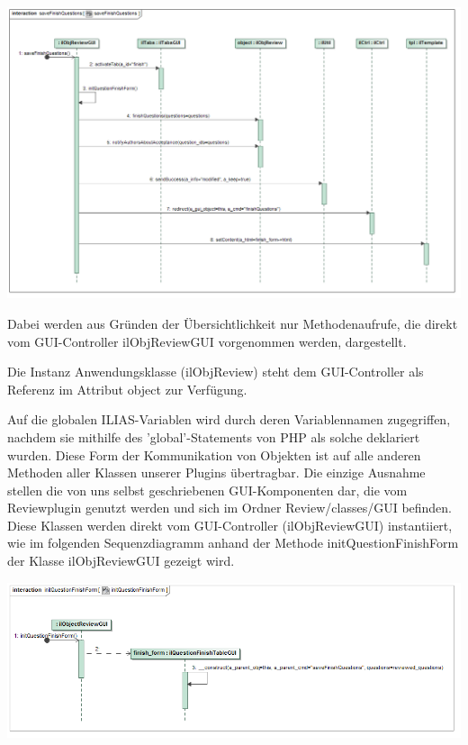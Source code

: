 \documentclass[a4paper]{scrreprt}
\begin{document}
\includegraphics[width=1.0\textwidth]{Sequence_Diagram__saveFinishQuestions__saveFinishQuestions.png}
\label{Fertige Fragen Speichern}

Dabei werden aus Gründen der Übersichtlichkeit nur Methodenaufrufe, die direkt vom GUI-Controller ilObjReviewGUI vorgenommen werden, dargestellt. 

Die Instanz Anwendungsklasse (ilObjReview) steht dem GUI-Controller als Referenz im Attribut object zur Verfügung.

Auf die globalen ILIAS-Variablen wird durch deren Variablennamen zugegriffen, nachdem sie mithilfe des 'global'-Statements von PHP als solche deklariert wurden. 
Diese Form der Kommunikation von Objekten ist auf alle anderen Methoden aller Klassen unserer Plugins übertragbar.
Die einzige Ausnahme stellen die von uns selbst geschriebenen GUI-Komponenten dar, die vom Reviewplugin genutzt werden und sich im Ordner Review/classes/GUI befinden. 
Diese Klassen werden direkt vom GUI-Controller (ilObjReviewGUI) instantiiert, wie im folgenden Sequenzdiagramm anhand der Methode initQuestionFinishForm der Klasse ilObjReviewGUI gezeigt wird.

\includegraphics[width=1.0\textwidth]{Sequence_Diagram__initQuestionFinishForm__initQuestionFinishForm}
\label{Iniziiere Finale Fragenform}
\end{document}
